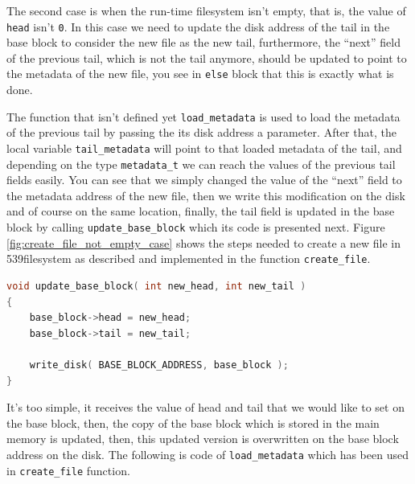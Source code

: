 The second case is when the run-time filesystem isn't empty, that is,
the value of \lstinline!head! isn't \lstinline!0!. In this case we need
to update the disk address of the tail in the base block to consider the
new file as the new tail, furthermore, the ``next'' field of the
previous tail, which is not the tail anymore, should be updated to point
to the metadata of the new file, you see in \lstinline!else! block that
this is exactly what is done.

The function that isn't defined yet \lstinline!load_metadata! is used to
load the metadata of the previous tail by passing the its disk address a
parameter. After that, the local variable \lstinline!tail_metadata! will
point to that loaded metadata of the tail, and depending on the type
\lstinline!metadata_t! we can reach the values of the previous tail
fields easily. You can see that we simply changed the value of the
``next'' field to the metadata address of the new file, then we write
this modification on the disk and of course on the same location,
finally, the tail field is updated in the base block by calling
\lstinline!update_base_block! which its code is presented next. Figure
\ref{fig:create_file_not_empty_case} shows the steps needed to create a
new file in 539filesystem as described and implemented in the function
\lstinline!create_file!.

\begin{lstlisting}[language=C]
void update_base_block( int new_head, int new_tail )
{
    base_block->head = new_head;
    base_block->tail = new_tail;
    
    write_disk( BASE_BLOCK_ADDRESS, base_block );
}
\end{lstlisting}

It's too simple, it receives the value of head and tail that we would
like to set on the base block, then, the copy of the base block which is
stored in the main memory is updated, then, this updated version is
overwritten on the base block address on the disk. The following is code
of \lstinline!load_metadata! which has been used in
\lstinline!create_file! function.


